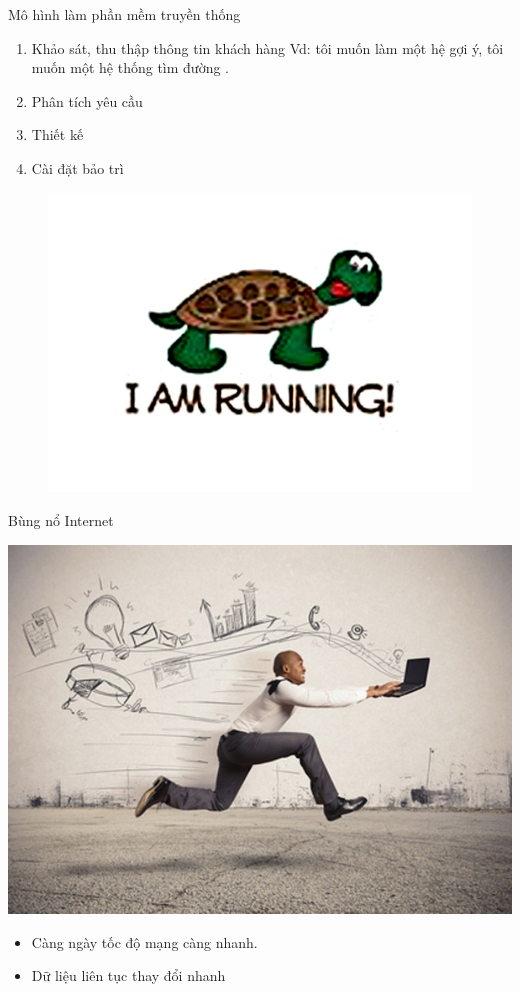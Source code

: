 \documentclass{beamer}
\begin{document}
\begin{frame}{Mô hình làm phần mềm truyền thống}
\begin{enumerate}
\item Khảo sát, thu thập thông tin khách hàng Vd: tôi muốn làm một hệ gợi ý, tôi muốn một hệ thống tìm đường .
\item Phân tích yêu cầu 
\item Thiết kế 
\item Cài đặt bảo trì 
\end{enumerate}
\begin{figure}
\begin{center}
\includegraphics[scale=0.5]{3.jpg}
\end{center}

\end{figure}
\end{frame}
\begin{frame}{Bùng nổ Internet}
\begin{center}
\includegraphics[scale=0.2]{internet.jpg}
\end{center}
\begin{itemize}
\item Càng ngày tốc độ mạng càng nhanh.
\item Dữ liệu liên tục thay đổi nhanh
\end{itemize}

\end{frame}
\end{document}
